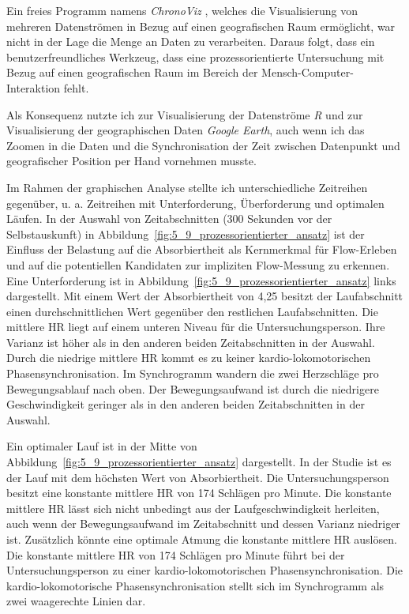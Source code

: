 Ein freies Programm namens \emph{ChronoViz} \citep{Fouse2010, Fouse2011}, welches die Visualisierung von mehreren Datenströmen in Bezug auf einen geografischen Raum ermöglicht, war nicht in der Lage die Menge an Daten zu verarbeiten. Daraus folgt, dass ein benutzerfreundliches Werkzeug, dass eine prozessorientierte Untersuchung mit Bezug auf einen geografischen Raum im Bereich der Mensch-Computer-Interaktion fehlt.

Als Konsequenz nutzte ich zur Visualisierung der Datenströme \emph{R} und zur Visualisierung der geographischen Daten \emph{Google Earth}, auch wenn ich das Zoomen in die Daten und die Synchronisation der Zeit zwischen Datenpunkt und geografischer Position per Hand vornehmen musste.

Im Rahmen der graphischen Analyse stellte ich unterschiedliche Zeitreihen gegenüber, u. a. Zeitreihen mit Unterforderung, Überforderung und optimalen Läufen. In der Auswahl von Zeitabschnitten (300 Sekunden vor der Selbstauskunft) in Abbildung~\ref{fig:5_9_prozessorientierter_ansatz} ist der Einfluss der Belastung auf die Absorbiertheit als Kernmerkmal für Flow-Erleben und auf die potentiellen Kandidaten zur impliziten Flow-Messung zu erkennen. Eine Unterforderung ist in Abbildung~\ref{fig:5_9_prozessorientierter_ansatz} links dargestellt. Mit einem Wert der Absorbiertheit von 4,25 besitzt der Laufabschnitt einen durchschnittlichen Wert gegenüber den restlichen Laufabschnitten. Die mittlere \ac{HR} liegt auf einem unteren Niveau für die Untersuchungsperson. Ihre Varianz ist höher als in den anderen beiden Zeitabschnitten in der Auswahl. Durch die niedrige mittlere \ac{HR} kommt es zu keiner kardio-lokomotorischen Phasensynchronisation. Im Synchrogramm wandern die zwei Herzschläge pro Bewegungsablauf nach oben. Der Bewegungsaufwand ist durch die niedrigere Geschwindigkeit geringer als in den anderen beiden Zeitabschnitten in der Auswahl.

Ein optimaler Lauf ist in der Mitte von Abbildung~\ref{fig:5_9_prozessorientierter_ansatz} dargestellt. In der Studie ist es der Lauf mit dem höchsten Wert von Absorbiertheit. Die Untersuchungsperson besitzt eine konstante mittlere \ac{HR} von 174 Schlägen pro Minute. Die konstante mittlere \ac{HR} lässt sich nicht unbedingt aus der Laufgeschwindigkeit herleiten, auch wenn der Bewegungsaufwand im Zeitabschnitt und dessen Varianz niedriger ist. Zusätzlich könnte eine optimale Atmung die konstante mittlere \ac{HR} auslösen. Die konstante mittlere \ac{HR} von 174 Schlägen pro Minute führt bei der Untersuchungsperson zu einer kardio-lokomotorischen Phasensynchronisation. Die kardio-lokomotorische Phasensynchronisation stellt sich im Synchrogramm als zwei waagerechte Linien dar.

